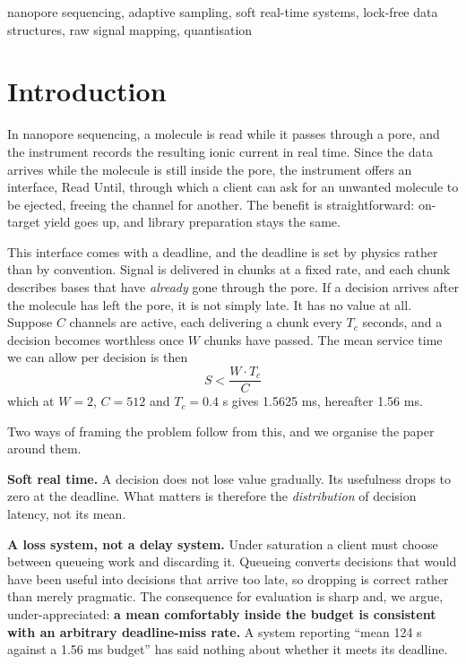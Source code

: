 \documentclass[conference]{IEEEtran}
\begin{document}
\begin{IEEEkeywords}
nanopore sequencing, adaptive sampling, soft real-time systems, lock-free data structures,
raw signal mapping, quantisation
\end{IEEEkeywords}

\section{Introduction}

In nanopore sequencing, a molecule is read while it passes through a pore, and the instrument
records the resulting ionic current in real time. Since the data arrives while the molecule is
still inside the pore, the instrument offers an interface, Read Until, through which a client
can ask for an unwanted molecule to be ejected, freeing the channel for another. The benefit is
straightforward: on-target yield goes up, and library preparation stays the same.

This interface comes with a deadline, and the deadline is set by physics rather than by
convention. Signal is delivered in chunks at a fixed rate, and each chunk describes bases that
have \emph{already} gone through the pore. If a decision arrives after the molecule has left
the pore, it is not simply late. It has no value at all. Suppose $C$ channels are active, each
delivering a chunk every $T_c$ seconds, and a decision becomes worthless once $W$ chunks have
passed. The mean service time we can allow per decision is then
\[ S < \frac{W \cdot T_c}{C} \]
which at $W = 2$, $C = 512$ and $T_c = 0.4$ s gives 1.5625 ms, hereafter 1.56 ms.

Two ways of framing the problem follow from this, and we organise the paper around them.

\textbf{Soft real time.} A decision does not lose value gradually. Its usefulness drops to zero
at the deadline. What matters is therefore the \emph{distribution} of decision latency, not its
mean.

\textbf{A loss system, not a delay system.} Under saturation a client must choose between
queueing work and discarding it. Queueing converts decisions that would have been useful into
decisions that arrive too late, so dropping is correct rather than merely pragmatic. The
consequence for evaluation is sharp and, we argue, under-appreciated: \textbf{a mean
comfortably inside the budget is consistent with an arbitrary deadline-miss rate.} A system
reporting ``mean 124 \textmu{}s against a 1.56 ms budget'' has said nothing about whether it meets its
deadline.
\end{document}
